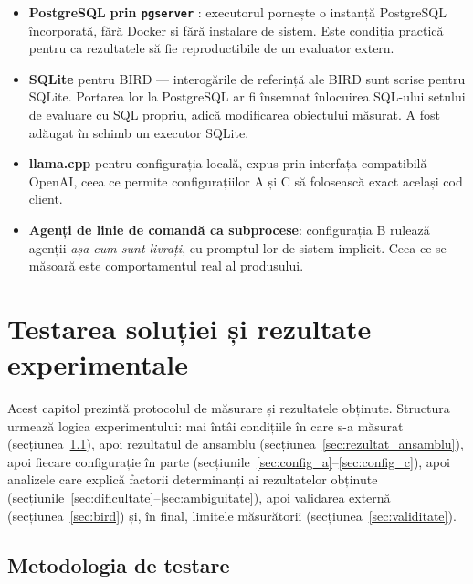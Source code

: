 \documentclass[12pt,a4paper]{report}
\newcommand{\code}[1]{\texttt{\small #1}}
\begin{document}
\begin{itemize}[nosep,leftmargin=*]
  \item \textbf{PostgreSQL} \cite{postgresql} \textbf{prin \code{pgserver}} \cite{pgserver}: executorul pornește o
    instanță PostgreSQL încorporată, fără Docker și fără instalare de sistem.
    Este condiția practică pentru ca rezultatele să fie reproductibile de un
    evaluator extern.
  \item \textbf{SQLite} \cite{sqlite} pentru BIRD — interogările de referință ale BIRD sunt
    scrise pentru SQLite. Portarea lor la PostgreSQL ar fi însemnat
    înlocuirea SQL-ului setului de evaluare cu SQL propriu, adică modificarea
    obiectului măsurat. A fost adăugat în schimb un executor SQLite.
  \item \textbf{llama.cpp} \cite{llamacpp} pentru configurația locală, expus prin interfața
    compatibilă OpenAI, ceea ce permite configurațiilor A și C să folosească
    exact același cod client.
  \item \textbf{Agenți de linie de comandă ca subprocese}: configurația B rulează
    agenții \emph{așa cum sunt livrați}, cu promptul lor de sistem implicit.
    Ceea ce se măsoară este comportamentul real al produsului.
\end{itemize}

\chapter{Testarea soluției și rezultate experimentale}
\label{chap:rezultate}

Acest capitol prezintă protocolul de măsurare și rezultatele obținute.
Structura urmează logica experimentului: mai întâi condițiile în care s-a
măsurat (secțiunea~\ref{sec:metodologie_testare}), apoi rezultatul de ansamblu (secțiunea~\ref{sec:rezultat_ansamblu}), apoi fiecare configurație în parte
(secțiunile~\ref{sec:config_a}--\ref{sec:config_c}), apoi analizele care explică factorii
determinanți ai rezultatelor obținute (secțiunile~\ref{sec:dificultate}--\ref{sec:ambiguitate}), apoi validarea externă (secțiunea~\ref{sec:bird}) și, în final, limitele
măsurătorii (secțiunea~\ref{sec:validitate}).

\section{Metodologia de testare}
\label{sec:metodologie_testare}
\end{document}
